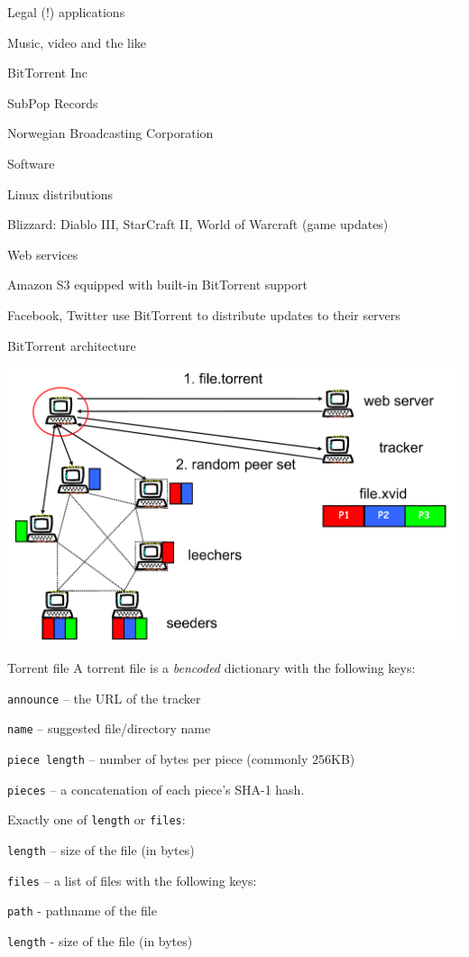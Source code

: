 \begin{frame}{Legal (!) applications}
	
\BIL
\item Music, video and the like
	\BI
	\item BitTorrent Inc
	\item SubPop Records
	\item Norwegian Broadcasting Corporation
	\EI
\item Software
	\BI
	\item Linux distributions
	\item Blizzard: Diablo III, StarCraft II, World of Warcraft (game updates)
	\EI
\item Web services
\BI
\item Amazon S3 equipped with built-in BitTorrent support
\item Facebook, Twitter use BitTorrent to distribute updates to their servers
\EI
\EIL
\end{frame}

\begin{frame}{BitTorrent architecture}
	
\includegraphics[width=\textwidth]{figs/10/bt-arch}	
	
\end{frame}






\begin{frame}{Torrent file}
A torrent file is a \textit{bencoded} dictionary with the following keys:
\BI
\item \texttt{announce} -- the URL of the tracker
\item \texttt{name} -- suggested file/directory name
\item \texttt{piece length} -- number of bytes per piece (commonly $256$KB)
\item \texttt{pieces} -- a concatenation of each piece's SHA-1 hash. 
\item Exactly one of \texttt{length} or \texttt{files}:
	\BI
	\item \texttt{length} -- size of the file (in bytes)
	\item \texttt{files} -- a list of files with the following keys:
		\BI
		\item \texttt{path} - pathname of the file
		\item \texttt{length} - size of the file (in bytes)
		\EI
	\EI
\EI
\end{frame}

